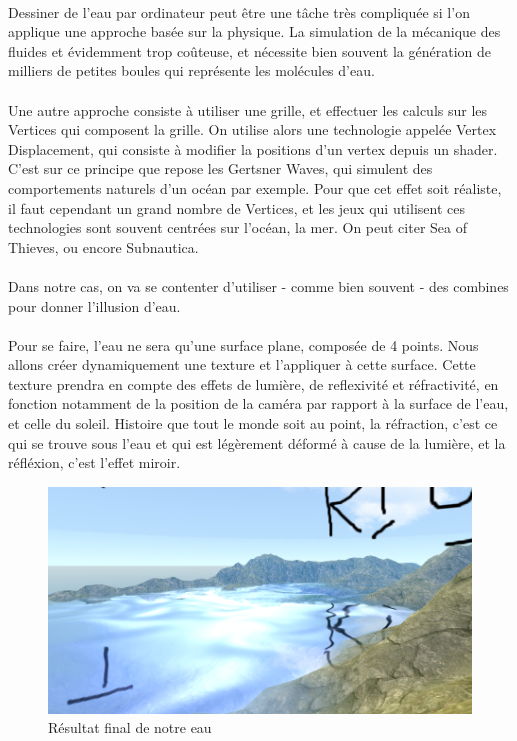 \documentclass{EPUProjetDi}
\begin{document}
\paragraph{}
Dessiner de l'eau par ordinateur peut être une tâche très compliquée si l'on applique une approche basée sur la physique. La simulation de la mécanique des fluides et évidemment trop coûteuse, et nécessite bien souvent la génération de milliers de petites boules qui représente les molécules d'eau.
\paragraph{}
Une autre approche consiste à utiliser une grille, et effectuer les calculs sur les Vertices qui composent la grille. On utilise alors une technologie appelée Vertex Displacement, qui consiste à modifier la positions d'un vertex depuis un shader. 
C'est sur ce principe que repose les Gertsner Waves, qui simulent des comportements naturels d'un océan par exemple. Pour que cet effet soit réaliste, il faut cependant un grand nombre de Vertices, et les jeux qui utilisent ces technologies sont souvent centrées sur l'océan, la mer. On peut citer Sea of Thieves, ou encore Subnautica.

\paragraph{}
Dans notre cas, on va se contenter d'utiliser - comme bien souvent - des combines pour donner l'illusion d'eau.
\paragraph{}
Pour se faire, l'eau ne sera qu'une surface plane, composée de 4 points. Nous allons créer dynamiquement une texture et l'appliquer à cette surface.
Cette texture prendra en compte des effets de lumière, de reflexivité et réfractivité, en fonction notamment de la position de la caméra par rapport à la surface de l'eau, et celle du soleil.
Histoire que tout le monde soit au point, la réfraction, c'est ce qui se trouve sous l'eau et qui est légèrement déformé à cause de la lumière, et la réfléxion, c'est l'effet miroir.

\begin{figure}[h]
	\centering
	\includegraphics[scale=.6]{water}
	\caption{Résultat final de notre eau}
	\label{fig:water}
\end{figure}
\end{document}

